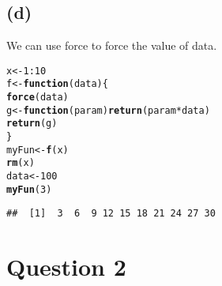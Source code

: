 \documentclass{article}\usepackage[]{graphicx}\usepackage[]{color}
\makeatletter
\newcommand{\hlnum}[1]{\textcolor[rgb]{0.686,0.059,0.569}{#1}}%
\newcommand{\hlopt}[1]{\textcolor[rgb]{0,0,0}{#1}}%
\newcommand{\hlstd}[1]{\textcolor[rgb]{0.345,0.345,0.345}{#1}}%
\newcommand{\hlkwa}[1]{\textcolor[rgb]{0.161,0.373,0.58}{\textbf{#1}}}%
\newcommand{\hlkwb}[1]{\textcolor[rgb]{0.69,0.353,0.396}{#1}}%
\newcommand{\hlkwc}[1]{\textcolor[rgb]{0.333,0.667,0.333}{#1}}%
\newcommand{\hlkwd}[1]{\textcolor[rgb]{0.737,0.353,0.396}{\textbf{#1}}}%
\newenvironment{kframe}{%
 \def\at@end@of@kframe{}%
 \ifinner\ifhmode%
  \def\at@end@of@kframe{\end{minipage}}%
  \begin{minipage}{\columnwidth}%
 \fi\fi%
 \def\FrameCommand##1{\hskip\@totalleftmargin \hskip-\fboxsep
 \colorbox{shadecolor}{##1}\hskip-\fboxsep
     \hskip-\linewidth \hskip-\@totalleftmargin \hskip\columnwidth}%
 \MakeFramed {\advance\hsize-\width
   \@totalleftmargin\z@ \linewidth\hsize
   \@setminipage}}%
 {\par\unskip\endMakeFramed%
 \at@end@of@kframe}
\newenvironment{knitrout}{}{} %
\makeatother
\begin{document}
\subsection{(d)}
We can use force to force the value of data.
\begin{knitrout}
\color{fgcolor}\begin{kframe}
\begin{alltt}
\hlstd{x} \hlkwb{<-} \hlnum{1}\hlopt{:}\hlnum{10}
\hlstd{f} \hlkwb{<-} \hlkwa{function}\hlstd{(}\hlkwc{data}\hlstd{)\{}
  \hlkwd{force}\hlstd{(data)}
  \hlstd{g} \hlkwb{<-} \hlkwa{function}\hlstd{(}\hlkwc{param}\hlstd{)} \hlkwd{return}\hlstd{(param} \hlopt{*} \hlstd{data)}
  \hlkwd{return}\hlstd{(g)}
\hlstd{\}}
\hlstd{myFun} \hlkwb{<-} \hlkwd{f}\hlstd{(x)}
\hlkwd{rm}\hlstd{(x)}
\hlstd{data} \hlkwb{<-} \hlnum{100}
\hlkwd{myFun}\hlstd{(}\hlnum{3}\hlstd{)}
\end{alltt}
\begin{verbatim}
##  [1]  3  6  9 12 15 18 21 24 27 30
\end{verbatim}
\end{kframe}
\end{knitrout}


\section{Question 2}
\end{document}
